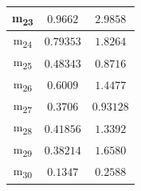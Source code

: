 \documentclass[12pt]{article}
\begin{document}
\begin{table}
\begin{tabular}{||c c c||}
			\hline
			m\textsubscript{23} & $0.9662$ & $2.9858$ \\
			\hline
			m\textsubscript{24} & $0.79353$ & $1.8264$ \\
			\hline
			m\textsubscript{25} & $0.48343$ & $0.8716$ \\
			\hline
			m\textsubscript{26} & $0.6009$ & $1.4477$ \\
			\hline
			m\textsubscript{27} & $0.3706$ & $0.93128$ \\
			\hline
			m\textsubscript{28} & $0.41856$ & $1.3392$ \\
			\hline
			m\textsubscript{29} & $0.38214$ & $1.6580$ \\
			\hline
			m\textsubscript{30} & $0.1347$ & $0.2588$ \\
			\hline
		\end{tabular}
	\label{Tab:Features_3_1}
\end{table}
\end{document}
